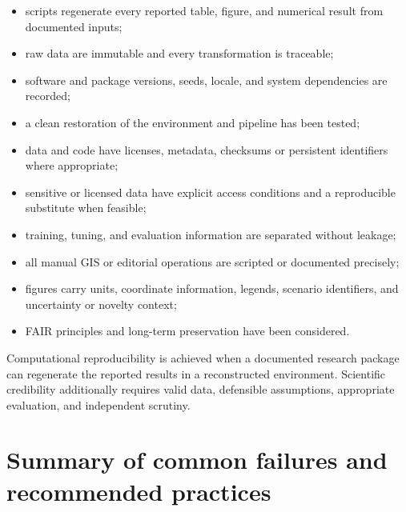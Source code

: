 \begin{itemize}
\item scripts regenerate every reported table, figure, and numerical result from documented inputs;
\item raw data are immutable and every transformation is traceable;
\item software and package versions, seeds, locale, and system dependencies are recorded;
\item a clean restoration of the environment and pipeline has been tested;
\item data and code have licenses, metadata, checksums or persistent identifiers where appropriate;
\item sensitive or licensed data have explicit access conditions and a reproducible substitute when feasible;
\item training, tuning, and evaluation information are separated without leakage;
\item all manual GIS or editorial operations are scripted or documented precisely;
\item figures carry units, coordinate information, legends, scenario identifiers, and uncertainty or novelty context;
\item FAIR principles and long-term preservation have been considered.
\end{itemize}

\begin{sdmkeybox}
Computational reproducibility is achieved when a documented research package can regenerate the reported results in a reconstructed environment. Scientific credibility additionally requires valid data, defensible assumptions, appropriate evaluation, and independent scrutiny.
\end{sdmkeybox}

\section{Summary of common failures and recommended practices}

